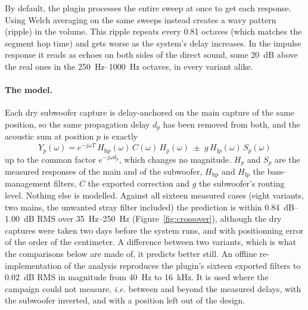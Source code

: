 \documentclass[10pt,a4paper]{article}
\begin{document}
By default, the plugin processes the entire sweep at once to get each response. Using Welch averaging on the same sweeps instead creates a wavy pattern (ripple) in the volume. This ripple repeats every 0.81 octaves (which matches the segment hop time) and gets worse as the system's delay increases. In the impulse response it reads as echoes on both sides of the direct sound, some \SI{20}{\dB} above the real ones in the \SIrange{250}{1000}{\hertz} octaves, in every variant alike.

\paragraph{The model.} Each dry subwoofer capture is delay-anchored on the main capture of the same position, so the same propagation delay $d_p$ has been removed from both, and the acoustic sum at position $p$ is exactly
\begin{equation}
  Y_p(\omega) = e^{-j\omega T}\,H_{\mathrm{hp}}(\omega)\,C(\omega)\,H_p(\omega)
              \;\pm\; g\,H_{\mathrm{lp}}(\omega)\,S_p(\omega)
  \label{eq:predsum}
\end{equation}
up to the common factor $e^{-j\omega d_p}$, which changes no magnitude. $H_p$ and $S_p$ are the measured responses of the main and of the subwoofer, $H_{\mathrm{hp}}$ and $H_{\mathrm{lp}}$ the bass-management filters, $C$ the exported correction and $g$ the subwoofer's routing level. Nothing else is modelled. Against all sixteen measured cases (eight variants, two mains, the unwanted stray filter included) the prediction is within \SIrange{0.84}{1.00}{\dB} RMS over \SIrange{35}{250}{\hertz} (Figure~\ref{fig:crossover}), although the dry captures were taken two days before the system runs, and with positionning error of the order of the centimeter. A difference between two variants, which is what the comparisons below are made of, it predicts better still. An offline re-implementation of the analysis reproduces the plugin's sixteen exported filters to \SI{0.02}{\dB} RMS in magnitude from \SI{40}{\hertz} to \SI{16}{\kilo\hertz}. It is used where the campaign could not measure, {\it i.e.} between and beyond the measured delays, with the subwoofer inverted, and with a position left out of the design.
\end{document}
